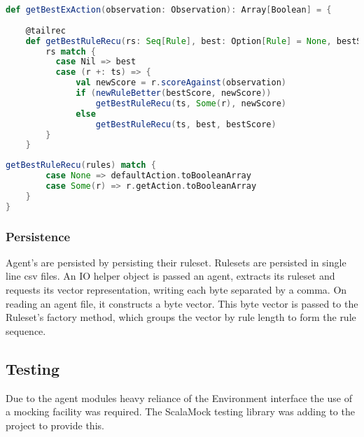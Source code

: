 \begin{minipage}{0.9\linewidth}
\centering
\begin{lstlisting}[language=scala]
def getBestExAction(observation: Observation): Array[Boolean] = {
    
    @tailrec
    def getBestRuleRecu(rs: Seq[Rule], best: Option[Rule] = None, bestScore: Int = 0): Option[Rule] = 
        rs match {
          case Nil => best
          case (r +: ts) => {
              val newScore = r.scoreAgainst(observation)
              if (newRuleBetter(bestScore, newScore))
                  getBestRuleRecu(ts, Some(r), newScore)
              else
                  getBestRuleRecu(ts, best, bestScore)
        }
    }
\end{lstlisting}
\end{minipage}
    
\begin{minipage}{0.9\linewidth}
\centering
\begin{lstlisting}[language=scala]
    getBestRuleRecu(rules) match {
        case None => defaultAction.toBooleanArray
        case Some(r) => r.getAction.toBooleanArray
    }
}
\end{lstlisting}
\end{minipage}


\subsubsection{Persistence}

Agent's are persisted by persisting their ruleset. Rulesets are persisted in single line csv files. An IO helper object is passed an agent, extracts its ruleset and requests its vector representation, writing each byte separated by a comma. On reading an agent file, it constructs a byte vector. This byte vector is passed to the Ruleset's factory method, which groups the vector by rule length to form the rule sequence.


\subsection{Testing}

Due to the agent modules heavy reliance of the Environment interface the use of a mocking facility was required. The ScalaMock testing library was adding to the project to provide this.

